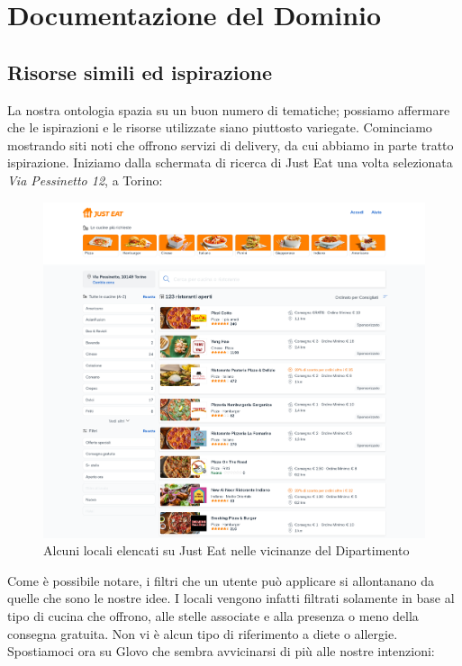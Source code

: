\documentclass[12pt]{article}
\begin{document}
\newpage
\section{Documentazione del Dominio}
\subsection{Risorse simili ed ispirazione}
La nostra ontologia spazia su un buon numero di tematiche; possiamo affermare che le ispirazioni e le risorse utilizzate siano piuttosto variegate.
\newline
Cominciamo mostrando siti noti che offrono servizi di delivery, da cui abbiamo in parte tratto ispirazione. Iniziamo dalla schermata di ricerca di Just Eat una volta selezionata \textit{Via Pessinetto 12}, a Torino:
\begin{figure}[H]
    \centering
    \includegraphics[width=12cm]{files/justEat.png}
    \caption{Alcuni locali elencati su Just Eat nelle vicinanze del Dipartimento}
\end{figure}
Come è possibile notare, i filtri che un utente può applicare si allontanano da quelle che sono le nostre idee. I locali vengono infatti filtrati solamente in base al tipo di cucina che offrono, alle stelle associate e alla presenza o meno della consegna gratuita. Non vi è alcun tipo di riferimento a diete o allergie.\newline
Spostiamoci ora su Glovo che sembra avvicinarsi di più alle nostre intenzioni:
\end{document}
